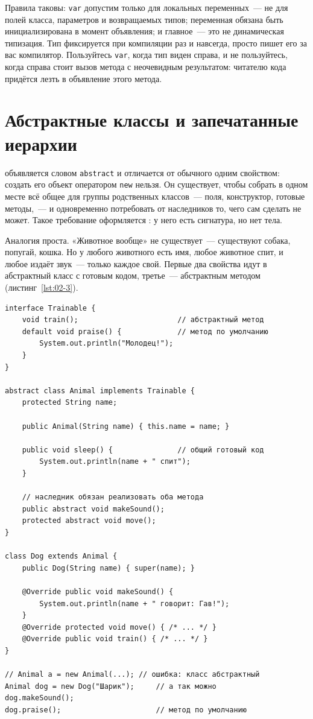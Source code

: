 Правила таковы: \texttt{var} допустим только для локальных переменных~--- не
для полей класса, параметров и возвращаемых типов; переменная обязана быть
инициализирована в момент объявления; и главное~--- это не динамическая
типизация. Тип фиксируется при компиляции раз и навсегда, просто пишет его за
вас компилятор. Пользуйтесь \texttt{var}, когда тип виден справа, и не
пользуйтесь, когда справа стоит вызов метода с неочевидным результатом:
читателю кода придётся лезть в объявление этого метода.

\section{Абстрактные классы и запечатанные иерархии}

 объявляется словом \texttt{abstract} и отличается от
обычного одним свойством: создать его объект оператором \texttt{new} нельзя. Он
существует, чтобы собрать в одном месте всё общее для группы родственных
классов~--- поля, конструктор, готовые методы,~--- и одновременно потребовать
от наследников то, чего сам сделать не может. Такое требование оформляется
: у него есть сигнатура, но нет тела.

Аналогия проста. «Животное вообще» не существует~--- существуют собака,
попугай, кошка. Но у любого животного есть имя, любое животное спит, и любое
издаёт звук~--- только каждое свой. Первые два свойства идут в абстрактный
класс с готовым кодом, третье~--- абстрактным методом
(листинг~\ref{lst:02-3}).

\begin{listing}[H]
\begin{verbatim}
interface Trainable {
    void train();                       // абстрактный метод
    default void praise() {             // метод по умолчанию
        System.out.println("Молодец!");
    }
}

abstract class Animal implements Trainable {
    protected String name;

    public Animal(String name) { this.name = name; }

    public void sleep() {               // общий готовый код
        System.out.println(name + " спит");
    }

    // наследник обязан реализовать оба метода
    public abstract void makeSound();
    protected abstract void move();
}

class Dog extends Animal {
    public Dog(String name) { super(name); }

    @Override public void makeSound() {
        System.out.println(name + " говорит: Гав!");
    }
    @Override protected void move() { /* ... */ }
    @Override public void train() { /* ... */ }
}

// Animal a = new Animal(...); // ошибка: класс абстрактный
Animal dog = new Dog("Шарик");     // а так можно
dog.makeSound();
dog.praise();                      // метод по умолчанию
\end{verbatim}
\caption{Интерфейс, абстрактный класс и его наследник}
\label{lst:02-3}
\end{listing}

